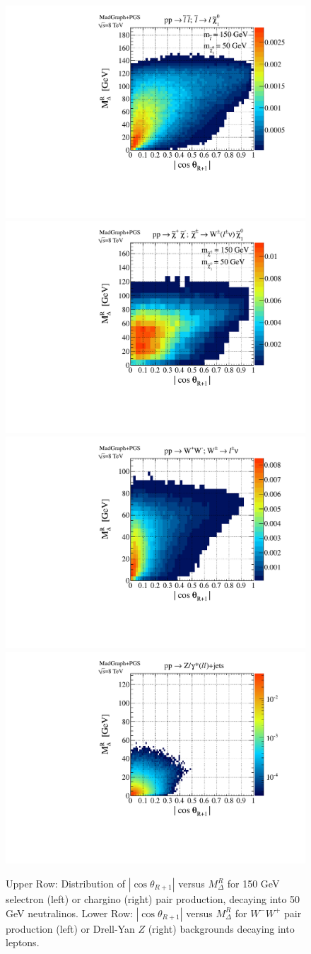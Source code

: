 \begin{figure}[ht]
\includegraphics[width=0.35\columnwidth]{fig/sectionII/Mdelta_v_costheta_slepton_150_50.pdf}
\includegraphics[width=0.35\columnwidth]{fig/sectionII/Mdelta_v_costheta_chargino_150_50.pdf}
\includegraphics[width=0.35\columnwidth]{fig/sectionII/Mdelta_v_costheta_WW.pdf}
\includegraphics[width=0.35\columnwidth]{fig/sectionII/Mdelta_v_costheta_DY.pdf}
\caption{Upper Row: Distribution of $|\cos\theta_{R+1}|$ versus $M_\Delta^R$ for 150 GeV selectron (left) or chargino (right) pair production, decaying into 50 GeV neutralinos. Lower Row: $|\cos\theta_{R+1}|$ versus $M_\Delta^R$ for $W^-W^+$ pair production (left) or Drell-Yan $Z$ (right) backgrounds decaying into leptons. \label{fig:costheta_v_MdeltaR}}
\end{figure}

